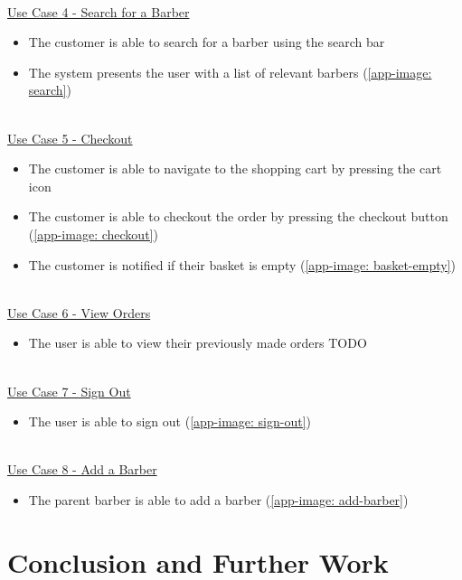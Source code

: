 \documentclass[12pt]{article}
\begin{document}
	\noindent
	\\
	\underline{Use Case 4 - Search for a Barber}
	
	\begin{itemize}
		\item The customer is able to search for a barber using the search bar
		\item The system presents the user with a list of relevant barbers (\autoref{app-image: search})
	\end{itemize}
	
	\noindent
	\\
	\underline{Use Case 5 - Checkout}
	
	\begin{itemize}
		\item The customer is able to navigate to the shopping cart by pressing the cart icon
		\item The customer is able to checkout the order by pressing the checkout button (\autoref{app-image: checkout})
		\item The customer is notified if their basket is empty (\autoref{app-image: basket-empty})
	\end{itemize}
	
	\noindent
	\\	
	\underline{Use Case 6 - View Orders}
	
	\begin{itemize}
		\item The user is able to view their previously made orders TODO
	\end{itemize}
	
	\noindent
	\\
	\underline{Use Case 7 - Sign Out}
	
	\begin{itemize}
		\item The user is able to sign out (\autoref{app-image: sign-out})
	\end{itemize}
	
	\noindent
	\\
	\underline{Use Case 8 - Add a Barber}
	
	\begin{itemize}
		\item The parent barber is able to add a barber (\autoref{app-image: add-barber})
	\end{itemize}
	
	
	\section{Conclusion and Further Work}
\end{document}
